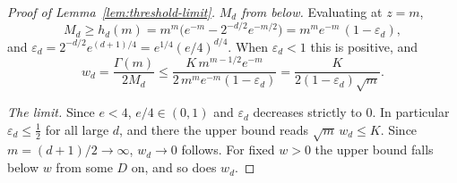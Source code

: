 \begin{proof}[Proof of Lemma~\ref{lem:threshold-limit}]
\emph{$M_d$ from below.} Evaluating at $z = m$,
\[
  M_d \ge h_d(m) = m^m\bigl(e^{-m} - 2^{-d/2}e^{-m/2}\bigr) = m^m e^{-m}\,(1 - \varepsilon_d) ,
\]
and $\varepsilon_d = 2^{-d/2}e^{(d+1)/4} = e^{1/4}(e/4)^{d/4}$. When $\varepsilon_d < 1$ this is
positive, and
\[
  w_d = \frac{\Gamma(m)}{2M_d} \le \frac{K\,m^{m-1/2}e^{-m}}{2\,m^m e^{-m}(1-\varepsilon_d)}
   = \frac{K}{2(1-\varepsilon_d)\sqrt m} .
\]

\emph{The limit.} Since $e < 4$, $e/4 \in (0,1)$ and $\varepsilon_d$ decreases strictly to $0$.
In particular $\varepsilon_d \le \tfrac12$ for all large $d$, and there the upper bound reads
$\sqrt m\,w_d \le K$. Since $m = (d+1)/2 \to \infty$, $w_d \to 0$ follows. For fixed $w > 0$ the
upper bound falls below $w$ from some $D$ on, and so does $w_d$.
\end{proof}

